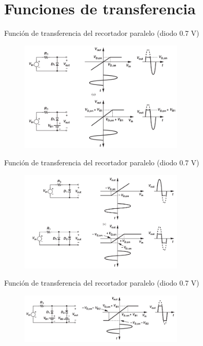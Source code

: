 \documentclass[t,aspectratio=169]{beamer}
\begin{document}
\section{Funciones de transferencia}
\begin{frame}{Función de transferencia del recortador paralelo (diodo 0.7 V)}

\begin{figure}
    \centering
    \includegraphics[width=0.7\textwidth]{figures/recortador_paralelo_transferencia_1.png}
\end{figure}

\end{frame}


\begin{frame}{Función de transferencia del recortador paralelo (diodo 0.7 V)}

\begin{figure}
    \centering
    \includegraphics[width=0.7\textwidth]{figures/recortador_paralelo_transferencia_2.png}
\end{figure}

\end{frame}


\begin{frame}{Función de transferencia del recortador paralelo (diodo 0.7 V)}

\begin{figure}
    \centering
    \includegraphics[width=0.7\textwidth]{figures/recortador_paralelo_transferencia_3.png}
\end{figure}

\end{frame}
\end{document}
